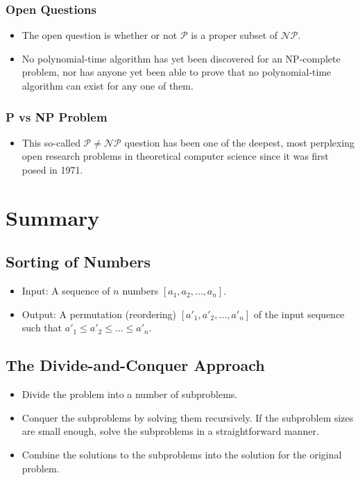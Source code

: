 \documentclass[12pt,openany]{book}
\theoremstyle{definition}
\begin{document}
	\subsection*{Open Questions}
	\begin{itemize}
		\item The open question is whether or not \( \mathcal{P} \) is a proper subset of \( \mathcal{NP} \).
		\item No polynomial-time algorithm has yet been discovered for an NP-complete problem, nor has anyone yet been able to prove that no polynomial-time algorithm can exist for any one of them.
	\end{itemize}
	
	\subsection*{P vs NP Problem}
	\begin{itemize}
		\item This so-called \( \mathcal{P} \neq \mathcal{NP} \) question has been one of the deepest, most perplexing open research problems in theoretical computer science since it was first posed in 1971.
	\end{itemize}
	
	
	\newpage
	\chapter{Summary}
	
	\section{Sorting of Numbers}
	\begin{itemize}
		\item Input: A sequence of \( n \) numbers \( [a_1, a_2, \ldots, a_n] \).
		\item Output: A permutation (reordering) \( [a'_1, a'_2, \ldots, a'_n] \) of the input sequence such that \( a'_1 \leq a'_2 \leq \ldots \leq a'_n \).
	\end{itemize}
	
	\section{The Divide-and-Conquer Approach}
	\begin{itemize}
		\item Divide the problem into a number of subproblems.
		\item Conquer the subproblems by solving them recursively. If the subproblem sizes are small enough, solve the subproblems in a straightforward manner.
		\item Combine the solutions to the subproblems into the solution for the original problem.
	\end{itemize}
	
\end{document}
